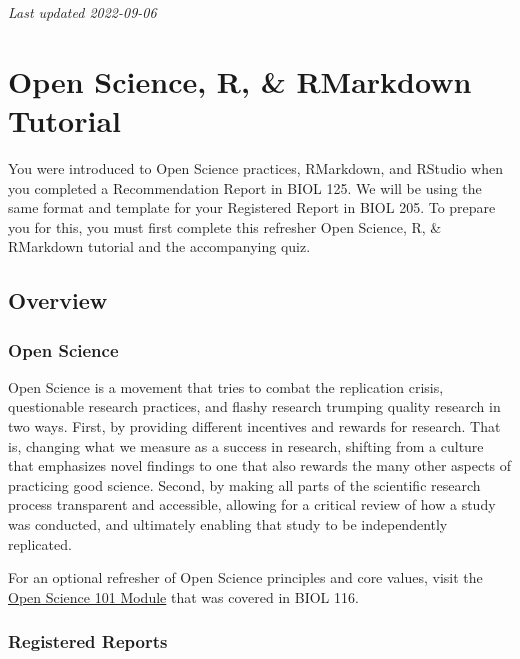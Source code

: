 \documentclass[
]{book}
\begin{document}
\emph{Last updated 2022-09-06}

\hypertarget{open-science-r-rmarkdown-tutorial}{%
\chapter*{Open Science, R, \& RMarkdown Tutorial}\label{open-science-r-rmarkdown-tutorial}}

You were introduced to Open Science practices, RMarkdown, and RStudio when you completed a Recommendation Report in BIOL 125. We will be using the same format and template for your Registered Report in BIOL 205. To prepare you for this, you must first complete this refresher Open Science, R, \& RMarkdown tutorial and the accompanying quiz.

\hypertarget{overview-1}{%
\section*{Overview}\label{overview-1}}

\hypertarget{open-science}{%
\subsection*{Open Science}\label{open-science}}

Open Science is a movement that tries to combat the replication crisis, questionable research practices, and flashy research trumping quality research in two ways. First, by providing different incentives and rewards for research. That is, changing what we measure as a success in research, shifting from a culture that emphasizes novel findings to one that also rewards the many other aspects of practicing good science. Second, by making all parts of the scientific research process transparent and accessible, allowing for a critical review of how a study was conducted, and ultimately enabling that study to be independently replicated.

For an optional refresher of Open Science principles and core values, visit the \href{https://ubco-biology.github.io/OS-Introduction/principles-of-open-science.html}{Open Science 101 Module} that was covered in BIOL 116.

\hypertarget{registered-reports}{%
\subsection*{Registered Reports}\label{registered-reports}}
\end{document}
